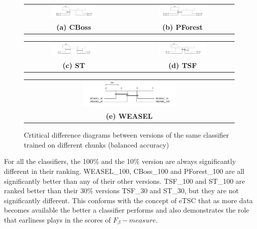 \begin{figure} [!htb]
  \centering
  \begin{tabular}{ccc}
  \includegraphics[width=0.49\textwidth]{cd_accuracy_within_cboss.png} & & 
  \includegraphics[width=0.49\textwidth]{cd_accuracy_within_pforest.png} \\
  \textbf{(a) CBoss} & & \textbf{(b) PForest} \\[6pt]
  \end{tabular}
  \begin{tabular}{ccc}
  \includegraphics[width=0.49\textwidth]{cd_accuracy_within_st.png} & & 
  \includegraphics[width=0.49\textwidth]{cd_accuracy_within_tsf.png} \\
  \textbf{(c) ST} & & \textbf{(d) TSF}  \\[6pt]
  \end{tabular}
  \begin{tabular}{ccc}
  & \includegraphics[width=0.49\textwidth]{cd_f_score_within_weasel.png} & \\
  & \textbf{(e) WEASEL} & \\[6pt]
  \end{tabular}
  \caption{Crtitical difference diagrams between versions of the same classifier trained on different chunks (balanced accuracy)}
  \label{fig:withinacc}
\end{figure}

For all the classifiers, the 100\% and the 10\% version are always significantly different in their ranking.
WEASEL\_100, CBoss\_100 and PForest\_100 are all significantly better than any of their other versions.
TSF\_100 and ST\_100 are ranked better than their 30\% versions TSF\_30 and ST\_30, but they are not significantly different.
This conforms with the concept of eTSC that as more data becomes available the better a classifier performs
and also demonstrates the role that earliness plays in the scores of $F_{\beta}-measure$.


